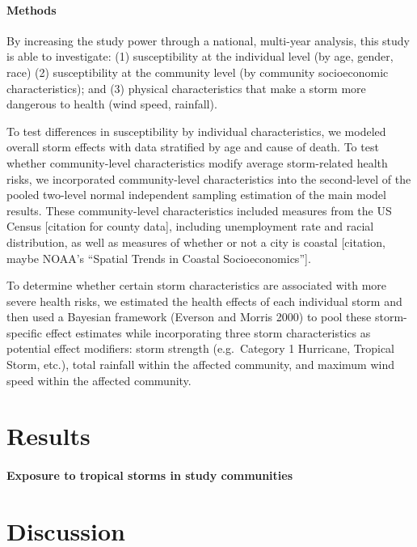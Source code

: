 \documentclass[]{elsarticle} %
\begin{document}
\paragraph{Methods}\label{methods}

By increasing the study power through a national, multi-year analysis,
this study is able to investigate: (1) susceptibility at the individual
level (by age, gender, race) (2) susceptibility at the community level
(by community socioeconomic characteristics); and (3) physical
characteristics that make a storm more dangerous to health (wind speed,
rainfall).

To test differences in susceptibility by individual characteristics, we
modeled overall storm effects with data stratified by age and cause of
death. To test whether community-level characteristics modify average
storm-related health risks, we incorporated community-level
characteristics into the second-level of the pooled two-level normal
independent sampling estimation of the main model results. These
community-level characteristics included measures from the US Census
{[}citation for county data{]}, including unemployment rate and racial
distribution, as well as measures of whether or not a city is coastal
{[}citation, maybe NOAA's ``Spatial Trends in Coastal
Socioeconomics''{]}.

To determine whether certain storm characteristics are associated with
more severe health risks, we estimated the health effects of each
individual storm and then used a Bayesian framework (Everson and Morris
2000) to pool these storm-specific effect estimates while incorporating
three storm characteristics as potential effect modifiers: storm
strength (e.g.~Category 1 Hurricane, Tropical Storm, etc.), total
rainfall within the affected community, and maximum wind speed within
the affected community.

\section{Results}\label{results}

\paragraph{Exposure to tropical storms in study
communities}\label{exposure-to-tropical-storms-in-study-communities}

\section{Discussion}\label{discussion}
\end{document}
